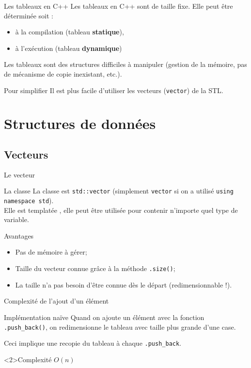 \begin{frame}{Les tableaux en C++}
Les tableaux en C++ sont de taille fixe. Elle peut être déterminée soit :
\begin{itemize}
    \item à la compilation (tableau \textbf{statique}),
    \item à l'exécution (tableau \textbf{dynamique})
\end{itemize}
Les tableaux sont des structures difficiles à manipuler (gestion de la mémoire, pas de mécanisme de copie inexistant, etc.).

\begin{exampleblock}{Pour simplifier}
Il est plus facile d'utiliser les vecteurs (\texttt{vector}) de la STL.
\end{exampleblock}

\end{frame}

\section{Structures de données}

\subsection{Vecteurs}


\begin{frame}{Le vecteur}
    \begin{block}{La classe}
    La classe est \texttt{std::vector} (simplement \texttt{vector} si on a utilisé \texttt{using namespace std}).\\
    Elle est \og templatée \fg, elle peut être utilisée pour contenir n'importe quel type de variable.
  \end{block}

\begin{exampleblock}{Avantages}
  \begin{itemize}
  \item Pas de mémoire à gérer;
  \item Taille du vecteur connue grâce à la méthode \texttt{.size()};
  \item La taille n'a pas besoin d'être connue dès le départ (redimensionnable !).
  \end{itemize}
\end{exampleblock}
\end{frame}

\begin{frame}{Complexité de l'ajout d'un élément}

\begin{block}{Implémentation naïve}
    Quand on ajoute un élément avec la fonction \texttt{.push_back()}, on redimensionne le tableau avec taille plus grande d'une case.
\end{block}

Ceci implique une recopie du tableau à chaque \texttt{.push_back}.

\begin{exampleblock}<2>{Complexité}
    \centering
    $O(n)$
\end{exampleblock}
\end{frame}

